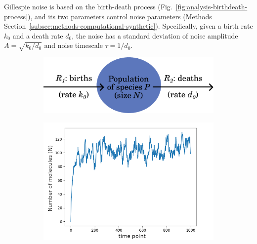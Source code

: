 Gillespie noise is based on the birth-death process (Fig.\ \ref{fig:analysis-birthdeath-process}), and its two parameters control noise parameters (Methods Section~\ref{subsec:methods-computational-synthetic}).
Specifically, given a birth rate $k_{0}$ and a death rate $d_{0}$, the noise has a standard deviation of noise amplitude $A = \sqrt{k_{0}/d_{0}}$ and noise timescale $\tau = 1/d_{0}$.

\begin{figure}[p]
  \centering
  \begin{subfigure}[t]{0.6\textwidth}
    \centering
    \includegraphics[width=\textwidth]{birth_death_process}
    \caption{
    }
    \label{fig:analysis-birthdeath-process-illustration}
  \end{subfigure}

  \begin{subfigure}[t]{0.6\textwidth}
    \centering
    \includegraphics[width=\textwidth]{gillespie}
    \caption{
    }
    \label{fig:gillespie_trajectory}
  \end{subfigure}


\end{figure}
